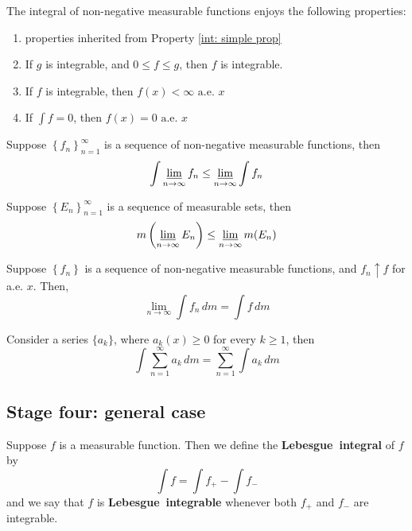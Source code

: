 \documentclass{ctexbook}
\begin{document}
\begin{prop}
    The integral of non-negative measurable functions enjoys the following properties:
    \begin{enumerate}
        \item properties inherited from Property \ref{int: simple prop}
        \item If $g$ is integrable, and $0\leq f\leq g$, then $f$ is integrable.
        \item If $f$ is integrable, then $f(x) < \infty\text{ a.e. }x$
        \item If $\int f = 0$, then $f(x) = 0\text{ a.e. }x$
    \end{enumerate}
\end{prop}

\begin{lema}[Fatou]
    \label{int: Fatou}
    Suppose $\left\{f_n\right\}_{n=1}^\infty$ is a sequence of non-negative measurable functions, then
    \[\int \varliminf_{n \rightarrow \infty} f_n \leq \varliminf_{n \rightarrow \infty} \int f_n\]
\end{lema}
\begin{cor}[Fatou]
    Suppose $\left\{E_n\right\}_{n=1}^\infty$ is a sequence of measurable sets, then
    \[m\left(\varliminf_{n \rightarrow \infty} E_n \right) \leq \varliminf_{n \rightarrow \infty} m(E_n)\]
\end{cor}

\begin{thm}
    Suppose $\left\{f_n\right\} $ is a sequence of non-negative measurable functions, and $f_n\uparrow f$ for a.e. $x$. Then,
    \[\lim_{n\rightarrow \infty}\int f_n\,dm = \int f\,dm\]
\end{thm}
\begin{cor}
    Consider a series $\{a_k\}$, where $a_k(x) \geq 0$ for every $k \geq 1$, then
    \[\int\sum_{n=1}^\infty a_k\, dm = \sum_{n=1}^\infty\int a_k\, dm\]
\end{cor}

\subsection{Stage four: general case}

\begin{define}
    Suppose $f$ is a measurable function. Then we define the \textbf{Lebesgue~integral} of $f$ by
    \[\int f = \int f_+ - \int f_-\]
    and we say that $f$ is \textbf{Lebesgue~integrable} whenever both $f_+$ and $f_-$ are integrable.
\end{define}
\end{document}
